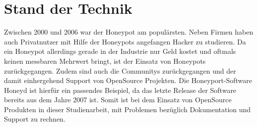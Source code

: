 \section{Stand der Technik}
Zwischen 2000 und 2006 war der Honeypot am populärsten. Neben Firmen haben auch Privatnutzer mit Hilfe der Honeypots angefangen Hacker zu studieren. Da ein Honeypot allerdings gerade in der Industrie nur Geld kostet und oftmals keinen messbaren Mehrwert bringt, ist der Einsatz von Honeypots zurückgegangen. Zudem sind auch die Communitys zurückgegangen und der damit einhergehend Support von OpenSource Projekten. Die Honeyport-Software Honeyd ist hierfür ein passendes Beispiel, da das letzte Release der Software bereits aus dem Jahre 2007 ist. Somit ist bei dem Einsatz von OpenSource Produkten in dieser Studienarbeit, mit Problemen bezüglich Dokumentation und Support zu rechnen.